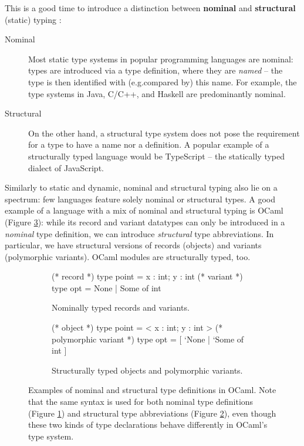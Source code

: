 \needspace{1em}
This is a good time to introduce a distinction between \textbf{nominal} and \textbf{structural} (static) typing \cite{tapl}: \begin{description}
    \item[Nominal] Most static type systems in popular programming languages are nominal: types are introduced via a type definition, where they are \emph{named} -- the type is then identified with (e.g.\@ compared by) this name. For example, the type systems in Java, C/C++, and Haskell are predominantly nominal.
    \item[Structural] On the other hand, a structural type system does not pose the requirement for a type to have a name nor a definition. A popular example of a structurally typed language would be TypeScript -- the statically typed dialect of JavaScript. 
\end{description}
Similarly to static and dynamic, nominal and structural typing also lie on a spectrum: few languages feature solely nominal or structural types. A good example of a language with a mix of nominal and structural typing is OCaml (Figure \ref{fig:nominal-and-structural-ocaml}): while its record and variant datatypes can only be introduced in a \emph{nominal} type definition, we can introduce \emph{structural} type abbreviations. In particular, we have structural versions of records (objects) and variants (polymorphic variants). OCaml modules are structurally typed, too.

\begin{figure}
    \centering
    \begin{subfigure}{.49\textwidth}
    \centering
    \begin{ocaml}
(* record *)
type point = { x : int; y : int }
(* variant *)
type opt = None | Some of int
    \end{ocaml}
    \caption{Nominally typed records and variants.}
    \label{subfig:nominal-ocaml}
    \end{subfigure}
    \hfill
    \begin{subfigure}{.49\textwidth}
    \centering
    \begin{ocaml}
(* object *)
type point = < x : int; y : int >
(* polymorphic variant *)
type opt = [ `None | `Some of int ]
    \end{ocaml}
    \caption{Structurally typed objects and polymorphic variants.}
    \label{subfig:structural-ocaml}
    \end{subfigure}
    \caption{Examples of nominal and structural type definitions in OCaml. Note that the same syntax is used for both nominal type definitions (Figure \ref{subfig:nominal-ocaml}) and structural type abbreviations (Figure \ref{subfig:structural-ocaml}), even though these two kinds of type declarations behave differently in OCaml's type system.}
    \label{fig:nominal-and-structural-ocaml}
\end{figure}

